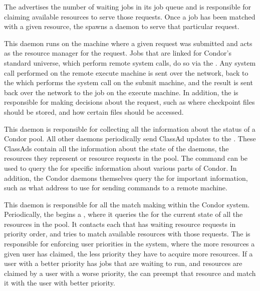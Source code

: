 \begin{description}
The  advertises the number of waiting jobs in its job queue and
is responsible for claiming available resources to serve those requests.  
Once a job has been matched with a given resource, the
 spawns a  daemon to serve that
particular request.

\item[\Condor{shadow}] This daemon
runs on the machine where a given
request was submitted and acts as the resource manager for the
request.  Jobs that are linked for Condor's standard universe, which
perform remote system calls, do so via the .  Any
system call performed on the remote execute machine is sent over the
network, back to the  which performs the
system call on the submit machine, and the result
is sent back over the network to the job on the execute machine.
In addition, 
the  is responsible for making decisions about the request,
such as where checkpoint files should be stored, 
and how certain files should be accessed.  

\item[\Condor{collector}] This daemon
is responsible for collecting
all the information about the status of a Condor pool.  All other
daemons periodically send ClassAd updates to
the .  These ClassAds contain all the information about the
state of the daemons, the resources they represent or resource
requests in the pool.
The  command can be used to query the
 for specific information about various parts of Condor.  
In addition, the Condor daemons themselves query the  for
important information, such as what address to use for sending
commands to a remote machine. 

\item[\Condor{negotiator}] This daemon
is responsible for all the match making within the Condor system.  
Periodically, the 
begins a , where it queries the 
 for
the current state of all the resources in the pool.  It contacts each
 that has waiting resource requests in priority order, 
and tries to match available resources with those requests.
The  is
responsible for enforcing user priorities in the system, where the
more resources a given user has claimed, the less priority they have
to acquire more resources.  If a user with a better priority has jobs
that are waiting to run, and resources are claimed by a user with a
worse priority, the  can preempt that resource and match it
with the user with better priority.


\end{description}
